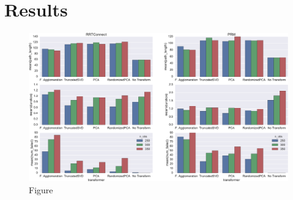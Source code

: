 \documentclass[12pt]{article}
\begin{document}
\section{Results}

\begin{figure}[h!]
    \centering
    \includegraphics[width=\textwidth]{plots}
    \caption{Figure}
\end{figure}
\end{document}
